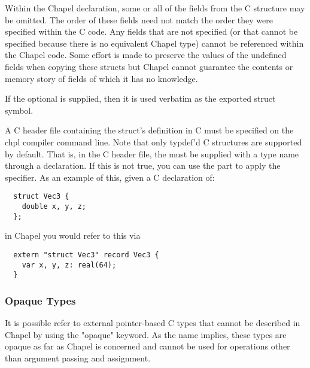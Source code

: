 Within the Chapel declaration, some or all of the fields from the C
structure may be omitted.  The order of these fields need not match
the order they were specified within the C code.  Any fields that are
not specified (or that cannot be specified because there is no
equivalent Chapel type) cannot be referenced within the Chapel code.  Some
effort is made to preserve the values of the undefined fields when copying
these structs but Chapel cannot guarantee the contents or memory story of
fields of which it has no knowledge.

If the optional  is supplied, then it is used verbatim as
the exported struct symbol.

A C header file containing the struct's definition in C must be specified on the
chpl compiler command line.  Note that only typdef'd C structures are supported
by default.  That is, in the C header file, the  must be supplied
with a type name through a  declaration. If this is not true, you
can use the  part to apply the  specifier.
As an example of this, given a C declaration of:

\begin{chapel}
\begin{verbatim}
  struct Vec3 {
    double x, y, z;
  };
\end{verbatim}
\end{chapel}

in Chapel you would refer to this  via

\begin{chapel}
\begin{verbatim}
  extern "struct Vec3" record Vec3 {
    var x, y, z: real(64);
  }
\end{verbatim}
\end{chapel}


\subsubsection{Opaque Types}
\label{Opaque_Types}

It is possible refer to external pointer-based C types that cannot be
described in Chapel by using the "opaque" keyword.  As the name implies,
these types are opaque as far as Chapel is concerned and cannot be
used for operations other than argument passing and assignment.

